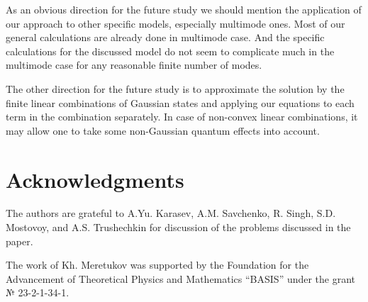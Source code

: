 \documentclass[12pt]{article}
\theoremstyle{definition}
\begin{document}
	As an obvious direction for the future study we should mention the application of our approach to other specific models, especially  multimode ones. Most of our general calculations are already done in multimode case. And the specific calculations for the discussed model do not seem to complicate much in the multimode case for any reasonable finite number of modes. 
	
	The other direction for the future study is to approximate the solution by the finite linear combinations of Gaussian states and applying our equations to each term in the combination separately. In case of non-convex linear combinations, it may allow one to take some non-Gaussian quantum effects into account.
	
	\section{Acknowledgments}
	
	The authors are grateful to A.Yu. Karasev, A.M. Savchenko, R. Singh, S.D. Mostovoy, and A.S. Trushechkin for discussion of the problems discussed in the paper.
	
	The work of Kh. Meretukov was supported by the Foundation for the Advancement of Theoretical Physics and Mathematics “BASIS” under the grant № 23-2-1-34-1.
	
	
	
 
 
%	
	
	
	
	
	
	
\end{document}
